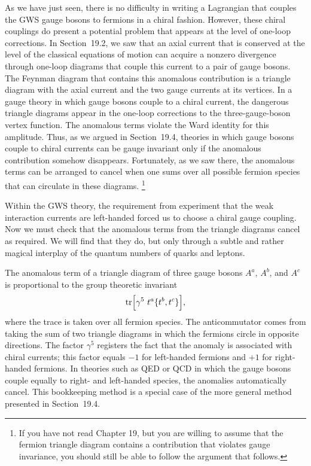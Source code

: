As we have just seen, there is no difficulty in writing a Lagrangian that
couples the GWS gauge bosons to fermions in a chiral fashion.  However, these
chiral couplings do present a potential problem that appears at the level of
one-loop corrections.  In Section~19.2, we saw that an axial current that is
conserved at the level of the classical equations of motion can acquire a
nonzero divergence through one-loop diagrams that couple this current to a
pair of gauge bosons.  The Feynman diagram that contains this anomalous
contribution is a triangle diagram with the axial current and the two gauge
currents at its vertices.  In a gauge theory in which gauge bosons couple to a
chiral current, the dangerous triangle diagrams appear in the one-loop
corrections to the three-gauge-boson vertex function.  The anomalous terms
violate the Ward identity for this amplitude.  Thus, as we argued in
Section~19.4, theories in which gauge bosons couple to chiral currents can be
gauge invariant only if the anomalous contribution somehow disappears.
Fortunately, as we saw there, the anomalous terms can be arranged to cancel
when one sums over all possible fermion species that can circulate in these
diagrams.%
\footnote{If you have not read Chapter 19, but you are willing to assume that
the fermion triangle diagram contains a contribution that violates gauge
invariance, you should still be able to follow the argument that follows.}

Within the GWS theory, the requirement from experiment that the weak
interaction currents are left-handed forced us to choose a chiral gauge
coupling.  Now we must check that the anomalous terms from the triangle
diagrams cancel as required.  We will find that they do, but only through a
subtle and rather magical interplay of the quantum numbers of quarks and
leptons.

The anomalous term of a triangle diagram of three gauge bosons $A^a$, $A^b$,
and $A^c$ is proportional to the group theoretic invariant
\begin{equation}
  \mathrm{tr}\Bigl[ \gamma^5\ t^a\{t^b, t^c\} \Bigr] ,
  \label{eq:20.81}
\end{equation}
where the trace is taken over all fermion species.  The anticommutator comes
from taking the sum of two triangle diagrams in which the fermions circle in
opposite directions.  The factor $\gamma^5$ registers the fact that the
anomaly is associated with chiral currents; this factor equals $-1$ for
left-handed fermions and $+1$ for right-handed fermions.  In theories such as
QED or QCD in which the gauge bosons couple equally to right- and left-handed
species, the anomalies automatically cancel.  This bookkeeping method is a
special case of the more general method presented in Section~19.4.

